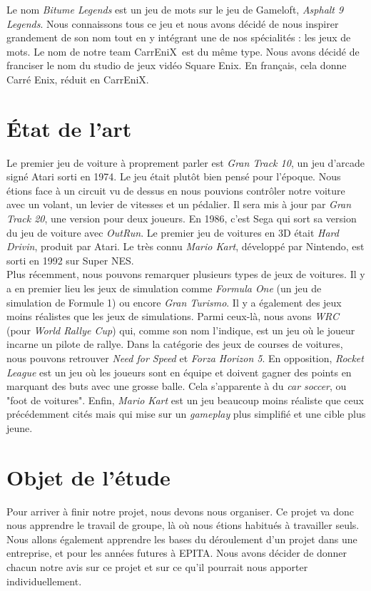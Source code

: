 \documentclass[12pt,a4paper]{article}
\newcommand{\CEX}{CarrEniX}
\begin{document}
\indent Le nom \textit{Bitume Legends} est un jeu de mots sur le jeu de Gameloft, \textit{Asphalt 9 Legends}.
Nous connaissons tous ce jeu et nous avons décidé de nous inspirer grandement de son nom tout en y intégrant
une de nos spécialités : les jeux de mots. Le nom de notre team \CEX\, est du même type. Nous avons décidé
de franciser le nom du studio de jeux vidéo Square Enix. En français, cela donne Carré Enix, réduit en
\CEX.\\

\section{État de l'art}
Le premier jeu de voiture à proprement parler est \textit{Gran Track 10}, un jeu d'arcade signé Atari 
sorti en 1974. Le jeu était plutôt bien pensé pour l'époque. Nous étions face à un 
circuit vu de dessus en nous pouvions contrôler notre voiture avec un volant, un levier de vitesses
et un pédalier. Il sera mis à jour par \textit{Gran Track 20}, une version pour deux joueurs.
En 1986, c'est Sega qui sort sa version du jeu de voiture avec \textit{OutRun}. Le premier 
jeu de voitures en 3D était \textit{Hard Drivin}, produit par Atari. Le très connu \textit{Mario Kart},
développé par Nintendo, est sorti en 1992 sur Super NES.\\

\indent Plus récemment, nous pouvons remarquer plusieurs types de jeux de voitures. Il y a en premier lieu 
les jeux de simulation comme \textit{Formula One} (un jeu de simulation de Formule 1) ou encore 
\textit{Gran Turismo}. Il y a également des jeux moins réalistes
que les jeux de simulations. Parmi ceux-là, nous avons \textit{WRC} (pour \textit{World Rallye Cup})
qui, comme son nom l'indique, est un jeu où le joueur incarne un pilote de rallye. Dans la 
catégorie des jeux de courses de voitures, nous pouvons retrouver 
\textit{Need for Speed} et \textit{Forza Horizon 5}.
En opposition, \textit{Rocket League} est un jeu où les joueurs sont en équipe  et doivent gagner des
points en marquant des buts avec une grosse balle. Cela s'apparente à du \textit{car soccer}, ou "foot
de voitures".
Enfin, \textit{Mario Kart} est un jeu beaucoup moins réaliste
que ceux précédemment cités mais qui mise sur un \textit{gameplay} plus simplifié et une cible plus jeune. 
\clearpage

\section{Objet de l'étude}
Pour arriver à finir notre projet, nous devons nous organiser.
Ce projet va donc nous apprendre le travail de groupe, là où nous étions habitués à travailler seuls. 
Nous allons également apprendre les bases du déroulement d'un projet dans une entreprise, 
et pour les années futures à EPITA. Nous avons décider de donner chacun notre avis sur ce projet et sur ce 
qu'il pourrait nous apporter individuellement.\\
\end{document}
